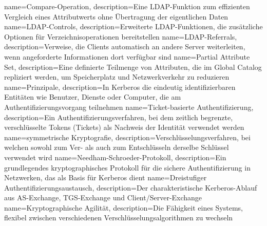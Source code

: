 {
	name={Com\-pare-Ope\-ra\-ti\-on},
	description={Eine LDAP-Funk\-ti\-on zum ef\-fi\-zi\-en\-ten Ver\-gleich ei\-nes At\-tri\-but\-werts ohne Über\-tra\-gung der ei\-gent\-li\-chen Da\-ten}
}
{
	name={LDAP-Con\-trols},
	description={Er\-wei\-ter\-te LDAP-Funk\-tio\-nen, die zu\-sätz\-li\-che Op\-tio\-nen für Ver\-zeich\-nis\-ope\-ra\-tio\-nen be\-reit\-stel\-len}
}
{
	name={LDAP-Re\-fer\-rals},
	description={Ver\-wei\-se, die Cli\-ents au\-to\-ma\-tisch an an\-de\-re Ser\-ver wei\-ter\-lei\-ten, wenn an\-ge\-for\-der\-te In\-for\-ma\-tio\-nen dort ver\-füg\-bar sind}
}
{
	name={Par\-ti\-al At\-tri\-bu\-te Set},
	description={Eine de\-fi\-nier\-te Teil\-men\-ge von At\-tri\-bu\-ten, die im Glo\-bal Ca\-ta\-log re\-pli\-ziert wer\-den, um Spei\-cher\-platz und Netz\-werk\-ver\-kehr zu re\-du\-zie\-ren}
}
{
	name={Prin\-zi\-pa\-le},
	description={In Ker\-be\-ros die ein\-deu\-tig iden\-ti\-fi\-zier\-ba\-ren En\-ti\-tä\-ten wie Be\-nut\-zer, Diens\-te oder Com\-pu\-ter, die am Au\-then\-ti\-fi\-zie\-rungs\-vor\-gang teil\-neh\-men}
}
{
	name={Ti\-cket-ba\-sier\-te Au\-then\-ti\-fi\-zie\-rung},
	description={Ein Au\-then\-ti\-fi\-zie\-rungs\-ver\-fah\-ren, bei dem zeit\-lich be\-grenz\-te, ver\-schlüs\-sel\-te To\-kens (Ti\-ckets) als Nach\-weis der Iden\-ti\-tät ver\-wen\-det wer\-den}
}
{
	name={sym\-me\-tri\-sche Kryp\-to\-gra\-fie},
	description={Ver\-schlüs\-se\-lungs\-ver\-fah\-ren, bei welchen so\-wohl zum Ver- als auch zum Ent\-schlüs\-seln der\-sel\-be Schlüs\-sel ver\-wen\-det wird}
}
{
	name={Need\-ham-Schroe\-der-Pro\-to\-koll},
	description={Ein grund\-le\-gen\-des kryp\-to\-gra\-phi\-sches Pro\-to\-koll für die si\-che\-re Au\-then\-ti\-fi\-zie\-rung in Netz\-wer\-ken, das als Ba\-sis für Ker\-be\-ros dient}
}
{
	name={Drei\-stu\-fi\-ger Au\-then\-ti\-fi\-zie\-rungs\-aus\-tausch},
	description={Der cha\-rak\-te\-ris\-ti\-sche Ker\-be\-ros-Ab\-lauf aus AS-Ex\-chan\-ge, TGS-Ex\-chan\-ge und Cli\-ent/Ser\-ver-Ex\-chan\-ge}
}
{
	name={Kryp\-to\-gra\-phi\-sche Agi\-li\-tät},
	description={Die Fä\-hig\-keit ei\-nes Sys\-tems, fle\-xi\-bel zwi\-schen ver\-schie\-de\-nen Ver\-schlüs\-se\-lungs\-al\-go\-rith\-men zu wech\-seln}
}
